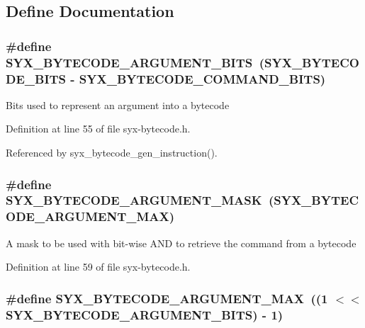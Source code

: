 \subsection{Define Documentation}
\hypertarget{syx-bytecode_8h_a30b8b0de5a0088b12f90cbe95ab59c1}{
\subsubsection{\setlength{\rightskip}{0pt plus 5cm}\#define SYX\_\-BYTECODE\_\-ARGUMENT\_\-BITS~(SYX\_\-BYTECODE\_\-BITS - SYX\_\-BYTECODE\_\-COMMAND\_\-BITS)}}
\label{syx-bytecode_8h_a30b8b0de5a0088b12f90cbe95ab59c1}


Bits used to represent an argument into a bytecode 

Definition at line 55 of file syx-bytecode.h.

Referenced by syx\_\-bytecode\_\-gen\_\-instruction().\hypertarget{syx-bytecode_8h_a7d9adeaec378162bd06f516142722e4}{
\subsubsection{\setlength{\rightskip}{0pt plus 5cm}\#define SYX\_\-BYTECODE\_\-ARGUMENT\_\-MASK~(SYX\_\-BYTECODE\_\-ARGUMENT\_\-MAX)}}
\label{syx-bytecode_8h_a7d9adeaec378162bd06f516142722e4}


A mask to be used with bit-wise AND to retrieve the command from a bytecode 

Definition at line 59 of file syx-bytecode.h.\hypertarget{syx-bytecode_8h_9e9106c938b74972a023d9035368f3e6}{
\subsubsection{\setlength{\rightskip}{0pt plus 5cm}\#define SYX\_\-BYTECODE\_\-ARGUMENT\_\-MAX~((1 $<$$<$ SYX\_\-BYTECODE\_\-ARGUMENT\_\-BITS) - 1)}}
\label{syx-bytecode_8h_9e9106c938b74972a023d9035368f3e6}


